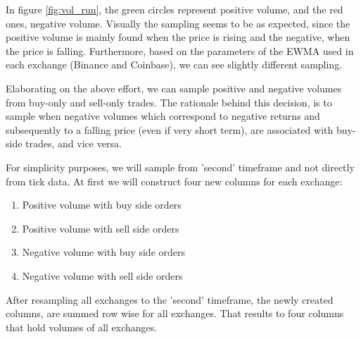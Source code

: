 In figure \ref{fig:vol_run}, the green circles represent positive volume, and the red ones, negative volume. Visually the sampling seems to be as expected, since the positive volume is mainly found when the price is rising and the negative, when the price is falling. Furthermore, based on the parameters of the EWMA used in each exchange (Binance and Coinbase), we can see slightly different sampling.

Elaborating on the above effort, we can sample positive and negative volumes from buy-only and sell-only trades. The rationale behind this decision, is to sample when negative volumes which correspond to negative returns and subsequently to a falling price (even if very short term), are associated with buy-side trades, and vice versa. 

For simplicity purposes, we will sample from 'second' timeframe and not directly from tick data. At first we will construct four new columns for each exchange:

\begin{enumerate}
\item Positive volume with buy side orders
\item Positive volume with sell side orders
\item Negative volume with buy side orders
\item Negative volume with sell side orders
\end{enumerate}

After resampling all exchanges to the 'second' timeframe, the newly created columns, are summed row wise for all exchanges. That results to four columns that hold volumes of all exchanges. 